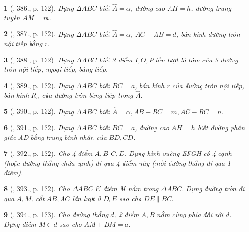 \documentclass{article}
\newtheorem{baitoan}{}
\begin{document}
\begin{baitoan}[\cite{Binh_Toan_9_tap_2}, 386., p. 132]
	Dựng $\Delta ABC$ biết $\widehat{A} = \alpha$, đường cao $AH = h$, đường trung tuyến $AM = m$.
\end{baitoan}

\begin{baitoan}[\cite{Binh_Toan_9_tap_2}, 387., p. 132]
	Dựng $\Delta ABC$ biết $\widehat{A} = \alpha$, $AC - AB = d$, bán kính đường tròn nội tiếp bằng $r$.
\end{baitoan}

\begin{baitoan}[\cite{Binh_Toan_9_tap_2}, 388., p. 132]
	Dựng $\Delta ABC$ biết 3 điểm $I,O,P$ lần lượt là tâm của 3 đường tròn nội tiếp, ngoại tiếp, bàng tiếp.
\end{baitoan}

\begin{baitoan}[\cite{Binh_Toan_9_tap_2}, 389., p. 132]
	Dựng $\Delta ABC$ biết $BC = a$, bán kính $r$ của đường tròn nội tiếp, bán kính $R_a$ của đường tròn bàng tiếp trong $\widehat{A}$.
\end{baitoan}

\begin{baitoan}[\cite{Binh_Toan_9_tap_2}, 390., p. 132]
	Dựng $\Delta ABC$ biết $\widehat{A} = \alpha,AB - BC = m,AC - BC = n$.
\end{baitoan}

\begin{baitoan}[\cite{Binh_Toan_9_tap_2}, 391., p. 132]
	Dựng $\Delta ABC$ biết $BC = a$, đường cao $AH = h$ biết đường phân giác AD bằng trung bình nhân của $BD,CD$.
\end{baitoan}

\begin{baitoan}[\cite{Binh_Toan_9_tap_2}, 392., p. 132]
	Cho 4 điểm $A,B,C,D$. Dựng hình vuông EFGH có 4 cạnh (hoặc đường thẳng chứa cạnh) đi qua 4 điểm này (mỗi đường thẳng đi qua 1 điểm).
\end{baitoan}

\begin{baitoan}[\cite{Binh_Toan_9_tap_2}, 393., p. 132]
	Cho $\Delta ABC$ \& điểm M nằm trong $\Delta ABC$. Dựng đường tròn đi qua $A,M$, cắt $AB,AC$ lần lượt ở $D,E$ sao cho $DE\parallel BC$.
\end{baitoan}

\begin{baitoan}[\cite{Binh_Toan_9_tap_2}, 394., p. 133]
	Cho đường thẳng $d$, 2 điểm $A,B$ nằm cùng phía đối với $d$. Dựng điểm $M\in d$ sao cho $AM + BM = a$.
\end{baitoan}
\end{document}
